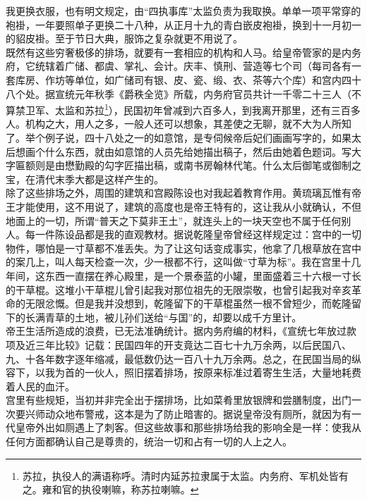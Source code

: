 我更换衣服，也有明文规定，由“四执事库”太监负责为我取换。单单一项平常穿的袍褂，一年要照单子更换二十八种，从正月十九的青白嵌皮袍褂，换到十一月初一的貂皮褂。至于节日大典，服饰之复杂就更不用说了。\\

既然有这些穷奢极侈的排场，就要有一套相应的机构和人马。给皇帝管家的是内务府，它统辖着广储、都虞、掌礼、会计。庆丰、慎刑、营造等七个司（每司各有一套库房、作坊等单位，如广储司有银、皮、瓷、缎、衣、茶等六个库）和宫内四十八个处。据宣统元年秋季《爵秩全览》所载，内务府官员共计一千零二十三人（不算禁卫军、太监和苏拉\footnote{苏拉，执役人的满语称呼。清时内延苏拉隶属于太监。内务府、军机处皆有之。雍和官的执役喇嘛，称苏拉喇嘛。}），民国初年曾减到六百多人，到我离开那里，还有三百多人。机构之大，用人之多，一般人还可以想象，其差使之无聊，就不大为人所知了。举个例子说，四十八处之一的如意馆，是专伺候帝后妃们画画写字的，如果太后想画个什么东西，就由如意馆的人员先给她描出稿子，然后由她着色题词。写大字匾额则是由懋勤殿的勾字匠描出稿，或南书房翰林代笔。什么太后御笔或御制之宝，在清代末季大都是这样产生的。\\

除了这些排场之外，周围的建筑和宫殿陈设也对我起着教育作用。黄琉璃瓦惟有帝王才能使用，这不用说了，建筑的高度也是帝王特有的，这让我从小就确认，不但地面上的一切，所谓“普天之下莫非王土”，就连头上的一块天空也不属于任何别人。每一件陈设品都是我的直观教材。据说乾隆皇帝曾经这样规定过：宫中的一切物件，哪怕是一寸草都不准丢失。为了让这句话变成事实，他拿了几根草放在宫中的案几上，叫人每天检查一次，少一根都不行，这叫做“寸草为标”。我在宫里十几年间，这东西一直摆在养心殿里，是一个景泰蓝的小罐，里面盛着三十六根一寸长的干草棍。这堆小干草棍儿曾引起我对那位祖先的无限崇敬，也曾引起我对辛亥革命的无限忿慨。但是我并没想到，乾隆留下的干草棍虽然一根不曾短少，而乾隆留下的长满青草的土地，被儿孙们送给“与国”的，却要以成千方里计。\\

帝王生活所造成的浪费，已无法准确统计。据内务府编的材料，《宣统七年放过款项及近三年比较》记载：民国四年的开支竟达二百七十九万余两，以后民国八、九、十各年数字逐年缩减，最低数仍达一百八十九万余两。总之，在民国当局的纵容下，以我为首的一伙人，照旧摆着排场，按原来标准过着寄生生活，大量地耗费着人民的血汗。\\

宫里有些规矩，当初并非完全出于摆排场，比如菜肴里放银牌和尝膳制度，出门一次要兴师动众地布警戒，这本是为了防止暗害的。据说皇帝没有厕所，就因为有一代皇帝外出如厕遇上了刺客。但这些故事和那些排场给我的影响全是一样：使我从任何方面都确认自己是尊贵的，统治一切和占有一切的人上之人。\\